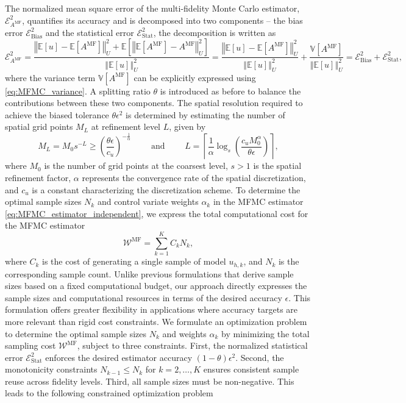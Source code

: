 %
The normalized mean square error of the multi-fidelity Monte Carlo estimator, $\mathcal{E}_{A^{\text{MF}}}^2$, quantifies its accuracy and is decomposed into two components -- the bias error $\mathcal{E}_{\text{Bias}}^2$ and the statistical error $\mathcal{E}_{\text{Stat}}^2$, the decomposition is written as 
%
\[
\mathcal{E}_{A^{\text{MF}}}^2= \frac{\left\Vert\mathbb{E}[u]-\mathbb{E}\left[A^{\text{MF}}\right] \right\Vert_{U}^2+\mathbb E\left[\left\Vert\mathbb{E}\left[A^{\text{MF}}\right]-A^{\text{MF}} \right\Vert_{U}^2\right]}{\left\Vert\mathbb{E}[u] \right\Vert_{U}^2} =\frac{\left\Vert\mathbb{E}[u]-\mathbb{E}\left[A^{\text{MF}}\right] \right\Vert_{U}^2}{\left\Vert\mathbb{E}[u] \right\Vert_{U}^2}+ \frac{\mathbb{V}\left[A^{\text{MF}}\right]}{\left\Vert\mathbb{E}[u] \right\Vert_{U}^2}=\mathcal{E}_{\text{Bias}}^2 + \mathcal{E}_{\text{Stat}}^2,
\]
%
where the variance term $\mathbb{V}[A^{\text{MF}}]$  can be explicitly expressed using \eqref{eq:MFMC_variance}. A splitting ratio $\theta$ is introduced as before to balance the contributions between these two components. The spatial resolution required to achieve the biased tolerance $\theta \epsilon^2$ is determined by estimating the number of spatial grid points $M_L$ at refinement level $L$, given by
%
\begin{equation}
    \label{eq:SLSGC_MLS_SpatialGridsNo}
    M_L = M_0s^{-L} \ge \left(\frac{\theta\epsilon}{c_u}\right)^{-\frac 1 {\alpha}} \qquad \text{ and } \qquad     L = \left\lceil \frac{1}{\alpha}\log_s \left(\frac{c_u M_0^\alpha}{\theta\epsilon}\right) \right\rceil,
\end{equation}
%
where $M_0$ is the number of grid points at the coarsest level, $s>1$ is the spatial refinement factor, $\alpha$ represents the convergence rate of the spatial discretization, and $c_u$ is a constant characterizing the discretization scheme. To determine the optimal sample sizes $N_k$ and control variate weights $\alpha_k$ in the MFMC estimator \eqref{eq:MFMC_estimator_independent}, we express the total computational cost for the MFMC estimator
%
\[
\mathcal{W}^{\text{MF}} = \sum_{k=1}^K C_kN_k,
\]
%
where $C_k$ is the cost of generating a single sample of model $u_{h,k}$, and $N_k$ is the corresponding sample count. Unlike previous formulations \cite{PeWiGu:2016} that derive sample sizes based on a fixed computational budget, our approach directly expresses the sample sizes and computational resources in terms of the desired accuracy $\epsilon$. This formulation offers greater flexibility in applications where accuracy targets are more relevant than rigid cost constraints. We formulate an optimization problem to determine the optimal sample sizes $N_k$ and weights $\alpha_k$ by minimizing the total sampling cost $\mathcal{W}^{\text{MF}}$, subject to three constraints. First, the normalized statistical error $\mathcal{E}_{\text{Stat}}^2$ enforces the desired estimator accuracy $(1-\theta)\epsilon^2$. Second,  the monotonicity constraints $N_{k-1}\le N_k$ for $k=2,\ldots, K$ ensures consistent sample reuse across fidelity levels. Third, all sample sizes must be non-negative. This leads to the following constrained optimization problem
